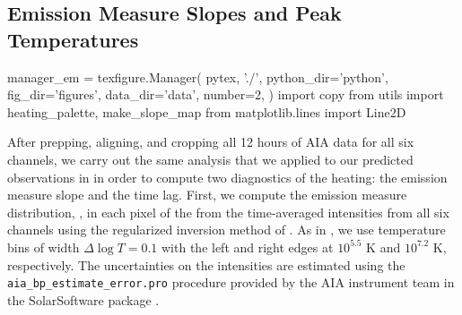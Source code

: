 \subsection{Emission Measure Slopes and Peak Temperatures}\label{sec:em_slopes}

\begin{pycode}[manager_em]
manager_em = texfigure.Manager(
    pytex, './',
    python_dir='python',
    fig_dir='figures',
    data_dir='data',
    number=2,
)
import copy
from utils import heating_palette, make_slope_map
from matplotlib.lines import Line2D
\end{pycode}

After prepping, aligning, and cropping all 12 hours of AIA data for all six channels, we carry out the same analysis that we applied to our predicted observations in  in order to compute two diagnostics of the heating: the emission measure slope and the time lag.
First, we compute the emission measure distribution, \dem, in each pixel of the \AR{} from the time-averaged intensities from all six channels using the regularized inversion method of \citet{hannah_differential_2012}.
As in , we use temperature bins of width $\Delta\log T=0.1$ with the left and right edges at $10^{5.5}$ K and $10^{7.2}$ K, respectively.
The uncertainties on the intensities are estimated using the \texttt{aia\_bp\_estimate\_error.pro} procedure provided by the AIA instrument team in the SolarSoftware package \citep[SSW,][]{freeland_data_1998}.  


